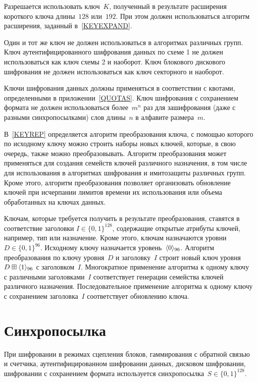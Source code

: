 Разрешается использовать ключ~$K$,
полученный в результате расширения короткого ключа длины~$128$ или~$192$. 
При этом должен использоваться алгоритм расширения,
заданный в~\ref{KEYEXPAND}.

Один и тот же ключ не должен использоваться в алгоритмах различных групп. 
%
Ключ аутентифицированного шифрования данных по схеме 1 не должен использоваться 
как ключ схемы 2 и наоборот.
%
Ключ блокового дискового шифрования не должен использоваться как ключ 
секторного и наоборот.

Ключи шифрования данных должны применяться в соответствии с квотами,
определенными в приложении~\ref{QUOTAS}.
%
Ключ шифрования с сохранением формата не должен использоваться 
более~$m^n$ раз для зашифрования (даже с разными синхропосылками) 
слов длины~$n$ в алфавите размера~$m$.

В~\ref{KEYREP} определяется алгоритм преобразования ключа, 
с помощью которого по исходному ключу можно строить наборы новых ключей,
которые, в свою очередь, также можно преобразовывать.
%
Алгоритм преобразования может применяться для создания семейств ключей 
различного назначения, в том числе для использования в алгоритмах 
шифрования и имитозащиты различных групп.
%
Кроме этого, алгоритм преобразования позволяет организовать
обновление ключей при исчерпании лимитов времени их использования 
или объема обработанных на ключах данных.

Ключам, которые требуется получить в результате преобразования, 
ставятся в соответствие заголовки $I\in\{0,1\}^{128}$,
содержащие открытые атрибуты ключей, например, тип или назначение.
%
Кроме этого, ключам назначаются уровни~$D\in\{0,1\}^{96}$.
%
Исходному ключу назначается уровень~$\langle0\rangle_{96}$.
%
Алгоритм преобразования по ключу уровня~$D$ и заголовку~$I$
строит новый ключ уровня~$D\boxplus\langle1\rangle_{96}$
с заголовком~$I$.
%
Многократное применение алгоритма к одному ключу с различными 
заголовками~$I$ соответствует генерации семейства ключей 
различного назначения.
%
Последовательное применение алгоритма к одному ключу 
с сохранением заголовка~$I$ соответствует обновлению ключа.

\section{Синхропосылка}\label{COMMON.IV}

При шифровании в режимах сцепления блоков, гаммирования 
с обратной связью и счетчика, аутентифицированном шифровании данных, 
дисковом шифровании, шифровании с сохранением формата
используется синхропосылка~$S\in\{0,1\}^{128}$.

